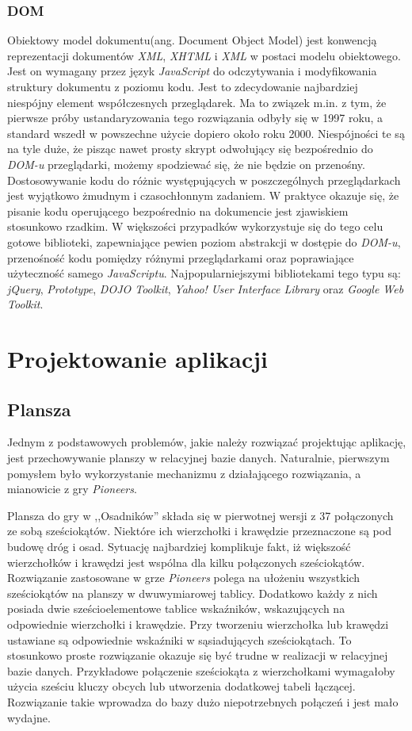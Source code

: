 \documentclass[a4paper,12pt]{article}
\begin{document}
\subsubsection{DOM}
Obiektowy model dokumentu(ang. Document Object Model) jest konwencją
reprezentacji dokumentów \emph{XML}, \emph{XHTML} i \emph{XML} w
postaci modelu obiektowego. Jest on wymagany przez język
\emph{JavaScript} do odczytywania i modyfikowania struktury dokumentu
z poziomu kodu\cite{dom}. Jest to zdecydowanie najbardziej niespójny
element współczesnych przeglądarek. Ma to związek m.in. z tym, że
pierwsze próby ustandaryzowania tego rozwiązania odbyły się w 1997
roku, a standard wszedł w powszechne użycie dopiero około roku
2000. Niespójności te są na tyle duże, że pisząc nawet prosty skrypt
odwołujący się bezpośrednio do \emph{DOM-u} przeglądarki, możemy
spodziewać się, że nie będzie on przenośny. Dostosowywanie kodu do
różnic występujących w poszczególnych przeglądarkach jest wyjątkowo
żmudnym i czasochłonnym zadaniem. W praktyce okazuje się, że pisanie
kodu operującego bezpośrednio na dokumencie jest zjawiskiem stosunkowo
rzadkim. W większości przypadków wykorzystuje się do tego celu gotowe
biblioteki, zapewniające pewien poziom abstrakcji w dostępie do
\emph{DOM-u}, przenośność kodu pomiędzy różnymi przeglądarkami oraz
poprawiające użyteczność samego
\emph{JavaScriptu}. Najpopularniejszymi bibliotekami tego typu są:
\emph{jQuery}, \emph{Prototype}, \emph{DOJO Toolkit}, \emph{Yahoo!
  User Interface Library} oraz \emph{Google Web Toolkit}.

\clearpage

\section{Projektowanie aplikacji}

\subsection{Plansza}\label{sec:board}
Jednym z podstawowych problemów, jakie należy rozwiązać projektując
aplikację, jest przechowywanie planszy w relacyjnej bazie
danych. Naturalnie, pierwszym pomysłem było wykorzystanie mechanizmu z
działającego rozwiązania, a mianowicie z gry \emph{Pioneers}.

Plansza do gry w ,,Osadników'' składa się w pierwotnej wersji z 37
połączonych ze sobą sześciokątów. Niektóre ich wierzchołki i krawędzie
przeznaczone są pod budowę dróg i osad. Sytuację najbardziej
komplikuje fakt, iż większość wierzchołków i krawędzi jest wspólna dla
kilku połączonych sześciokątów. Rozwiązanie zastosowane w grze
\emph{Pioneers} polega na ułożeniu wszystkich sześciokątów na planszy
w dwuwymiarowej tablicy. Dodatkowo każdy z nich posiada dwie
sześcioelementowe tablice wskaźników, wskazujących na odpowiednie
wierzchołki i krawędzie. Przy tworzeniu wierzchołka lub krawędzi
ustawiane są odpowiednie wskaźniki w sąsiadujących sześciokątach. To
stosunkowo proste rozwiązanie okazuje się być trudne w realizacji w
relacyjnej bazie danych. Przykładowe połączenie sześciokąta z
wierzchołkami wymagałoby użycia sześciu kluczy obcych lub utworzenia
dodatkowej tabeli łączącej. Rozwiązanie takie wprowadza do bazy dużo
niepotrzebnych połączeń i jest mało wydajne.
\end{document}
